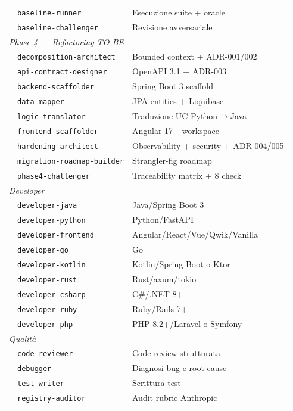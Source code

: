 \documentclass[12pt,a4paper,twoside]{book}
\begin{document}
\begin{longtable}{llp{7cm}}
 & \texttt{baseline-runner} & Esecuzione suite + oracle \\
 & \texttt{baseline-challenger} & Revisione avversariale \\
\midrule
\multicolumn{3}{l}{\textit{Phase 4 — Refactoring TO-BE}} \\
 & \texttt{decomposition-architect} & Bounded context + ADR-001/002 \\
 & \texttt{api-contract-designer} & OpenAPI 3.1 + ADR-003 \\
 & \texttt{backend-scaffolder} & Spring Boot 3 scaffold \\
 & \texttt{data-mapper} & JPA entities + Liquibase \\
 & \texttt{logic-translator} & Traduzione UC Python$\rightarrow$Java \\
 & \texttt{frontend-scaffolder} & Angular 17+ workspace \\
 & \texttt{hardening-architect} & Observability + security + ADR-004/005 \\
 & \texttt{migration-roadmap-builder} & Strangler-fig roadmap \\
 & \texttt{phase4-challenger} & Traceability matrix + 8 check \\
\midrule
\multicolumn{3}{l}{\textit{Developer}} \\
 & \texttt{developer-java} & Java/Spring Boot 3 \\
 & \texttt{developer-python} & Python/FastAPI \\
 & \texttt{developer-frontend} & Angular/React/Vue/Qwik/Vanilla \\
 & \texttt{developer-go} & Go \\
 & \texttt{developer-kotlin} & Kotlin/Spring Boot o Ktor \\
 & \texttt{developer-rust} & Rust/axum/tokio \\
 & \texttt{developer-csharp} & C\#/.NET 8+ \\
 & \texttt{developer-ruby} & Ruby/Rails 7+ \\
 & \texttt{developer-php} & PHP 8.2+/Laravel o Symfony \\
\midrule
\multicolumn{3}{l}{\textit{Qualità}} \\
 & \texttt{code-reviewer} & Code review strutturata \\
 & \texttt{debugger} & Diagnosi bug e root cause \\
 & \texttt{test-writer} & Scrittura test \\
 & \texttt{registry-auditor} & Audit rubric Anthropic \\

\end{longtable}
\end{document}
